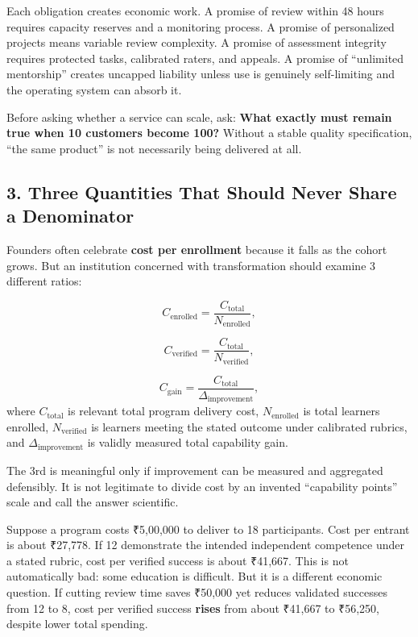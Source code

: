 Each obligation creates economic work. A promise of review within 48 hours requires capacity reserves and a monitoring process. A promise of personalized projects means variable review complexity. A promise of assessment integrity requires protected tasks, calibrated raters, and appeals. A promise of ``unlimited mentorship'' creates uncapped liability unless use is genuinely self-limiting and the operating system can absorb it.

Before asking whether a service can scale, ask: \textbf{What exactly must remain true when 10 customers become 100?} Without a stable quality specification, ``the same product'' is not necessarily being delivered at all.

\subsection*{3. Three Quantities That Should Never Share a Denominator}

Founders often celebrate \textbf{cost per enrollment} because it falls as the cohort grows. But an institution concerned with transformation should examine 3 different ratios:

\begin{equation}
C_{\text{enrolled}} = \frac{C_{\text{total}}}{N_{\text{enrolled}}},
\end{equation}

\begin{equation}
C_{\text{verified}} = \frac{C_{\text{total}}}{N_{\text{verified}}},
\end{equation}

\begin{equation}
C_{\text{gain}} = \frac{C_{\text{total}}}{\Delta_{\text{improvement}}},
\end{equation}
where $C_{\text{total}}$ is relevant total program delivery cost, $N_{\text{enrolled}}$ is total learners enrolled, $N_{\text{verified}}$ is learners meeting the stated outcome under calibrated rubrics, and $\Delta_{\text{improvement}}$ is validly measured total capability gain.

The 3rd is meaningful only if improvement can be measured and aggregated defensibly. It is not legitimate to divide cost by an invented ``capability points'' scale and call the answer scientific.

Suppose a program costs ₹5,00,000 to deliver to 18 participants. Cost per entrant is about ₹27,778. If 12 demonstrate the intended independent competence under a stated rubric, cost per verified success is about ₹41,667. This is not automatically bad: some education is difficult. But it is a different economic question. If cutting review time saves ₹50,000 yet reduces validated successes from 12 to 8, cost per verified success \textbf{rises} from about ₹41,667 to ₹56,250, despite lower total spending.

